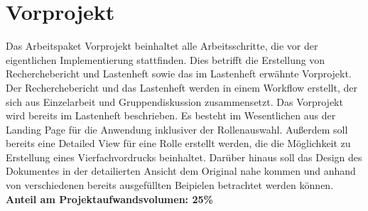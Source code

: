 \section{Vorprojekt} 
Das Arbeitspaket Vorprojekt beinhaltet alle Arbeitsschritte, die vor der 
eigentlichen Implementierung stattfinden. Dies betrifft die Erstellung von 
Recherchebericht und Lastenheft sowie das im Lastenheft erwähnte Vorprojekt. 
Der Recherchebericht und das Lastenheft werden in einem Workflow erstellt, 
der sich aus Einzelarbeit und Gruppendiskussion zusammensetzt. 
Das Vorprojekt wird bereits im Lastenheft beschrieben. Es besteht 
im Wesentlichen aus der Landing Page für die Anwendung inklusiver der 
Rollenauswahl. Außerdem soll bereits eine Detailed View für eine Rolle 
erstellt werden, die die Möglichkeit zu Erstellung eines Vierfachvordrucks 
beinhaltet. Darüber hinaus soll das Design des Dokumentes in der detailierten 
Ansicht dem Original nahe kommen und anhand von verschiedenen bereits 
ausgefüllten Beipielen betrachtet werden können.
\textbf{Anteil am Projektaufwandsvolumen: 25\%}